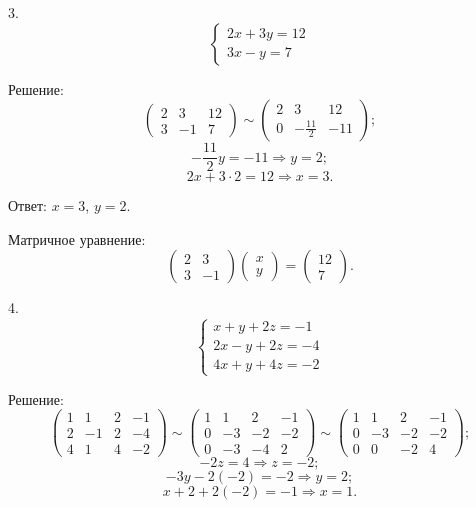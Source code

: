 \documentclass[14pt,a4paper]{extarticle}
\begin{document}
3.
\[
\left\{
\begin{array}{l}
2x + 3y = 12 \\
3x - y = 7
\end{array}
\right.
\]

Решение:
\[
\left(\begin{array}{cc|c}
2 & 3 & 12 \\
3 & -1 & 7
\end{array}\right)
\sim
\left(\begin{array}{cc|c}
2 & 3 & 12 \\
0 & -\frac{11}{2} & -11
\end{array}\right)
;\]
\[
-\frac{11}{2}y = -11 \Rightarrow y = 2
;\]
\[
2x + 3 \cdot 2 = 12 \Rightarrow x = 3
.\]

Ответ: \( x = 3 \), \( y = 2 \).

Матричное уравнение:
\[\begin{pmatrix}2 & 3 \\3 & -1\end{pmatrix}\begin{pmatrix}x \\y\end{pmatrix}=\begin{pmatrix}12 \\7\end{pmatrix}.\]

4.
\[
\left\{
\begin{array}{l}
x + y + 2z = -1 \\
2x - y + 2z = -4 \\
4x + y + 4z = -2
\end{array}
\right.
\]

Решение:\\
\[
\left(\begin{array}{ccc|c}
1 & 1 & 2 & -1 \\
2 & -1 & 2 & -4 \\
4 & 1 & 4 & -2
\end{array}\right)
\sim
\left(\begin{array}{ccc|c}
1 & 1 & 2 & -1 \\
0 & -3 & -2 & -2 \\
0 & -3 & -4 & 2
\end{array}\right)
\sim
\left(\begin{array}{ccc|c}
1 & 1 & 2 & -1 \\
0 & -3 & -2 & -2 \\
0 & 0 & -2 & 4
\end{array}\right)
;\]
\[
-2z = 4 \Rightarrow z = -2
;\]
\[
-3y - 2(-2) = -2 \Rightarrow y = 2
;\]
\[
x + 2 + 2(-2) = -1 \Rightarrow x = 1
.\]
\end{document}
